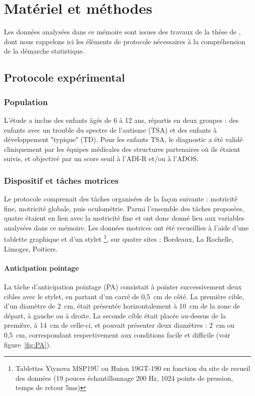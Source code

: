 
\chapter{Matériel et méthodes}

Les données analysées dans ce mémoire sont issues des travaux de la thèse de \textcite{benchekri_mieux_2024}, dont nous rappelons 
ici les éléments de protocole nécessaires à la compréhension 
de la démarche statistique. 


\section{Protocole expérimental}

\subsection{Population}
L'étude a inclus des enfants âgés de 6 à 12 ans, répartis en deux groupes : des enfants avec un trouble du spectre de l'autisme (TSA) et des enfants à développement "typique" (TD). Pour les enfants TSA, le diagnostic a été validé cliniquement par les équipes médicales des structures partenaires où ils étaient suivis, et objectivé par un score seuil à l'ADI-R et/ou à l'ADOS.

\subsection{Dispositif et tâches motrices}

Le protocole comprenait des tâches organisées de la façon suivante : motricité fine, motricité globale, puis oculométrie. Parmi l'ensemble des tâches proposées, quatre étaient en lien avec la motricité fine et ont donc donné lieu aux variables analysées dans ce mémoire. Les données motrices ont été recueillies à l'aide d'une tablette graphique et d'un stylet \footnote{Tablettes Yiynova MSP19U ou Huion 19GT-190 en fonction du site de recueil des données (19 pouces échantillonnage 200 Hz, 1024 points de pression, temps de retour 5ms)}, sur quatre sites : Bordeaux, La Rochelle, Limoges, Poitiers.


\subsubsection{Anticipation pointage}

La tâche d'anticipation pointage (PA) consistait à pointer successivement deux cibles avec le stylet, en partant d'un carré de 0,5~cm de côté. La première cible, d'un diamètre de 2~cm, était présentée horizontalement à 10~cm de la zone de départ, à gauche ou à droite. La seconde cible était placée au-dessus de la première, à 14~cm de celle-ci, et pouvait présenter deux diamètres : 2~cm ou 0,5~cm, correspondant respectivement aux conditions facile et difficile (voir figure~\ref{fig:PA}).


